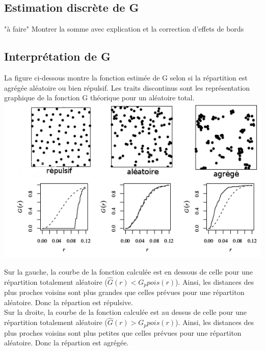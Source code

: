 \documentclass[french,12pt,a4paper]{report}
\begin{document}
\subsection{Estimation discrète de G}
"à faire"
Montrer la somme avec explication et la correction d'effets de bords


\subsection{Interprétation de G }
La figure ci-dessous montre la fonction estimée de G selon si la répartition est agrégée aléatoire ou bien répulsif. Les traits discontinus sont les représentation graphique de la fonction G théorique pour un aléatoire total.\\

\includegraphics[scale=0.7]{images/interpret2.png}

Sur la gauche, la courbe de la fonction calculée est en dessous de celle pour une répartition totalement aléatoire (\begin{math}\hat{G}(r) < G_p{pois}(r) \end{math}). Ainsi, les distances des plus proches voisins sont plus grandes que celles prévues pour une répartiton aléatoire. Donc la répartion est répulsive.\\
\indent
Sur la droite, la courbe de la fonction calculée est au dessus de celle pour une répartition totalement aléatoire (\begin{math}\hat{G}(r) > G_p{pois}(r) \end{math}). Ainsi, les distances des plus proches voisins sont plus petites que celles prévues pour une répartiton aléatoire. Donc la répartion est agrégée.\\
\end{document}
